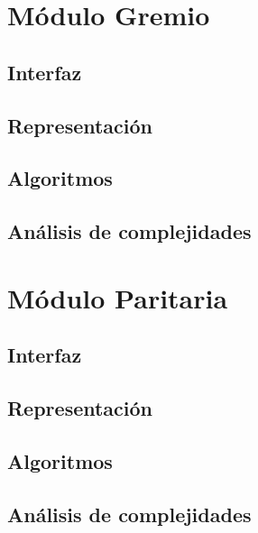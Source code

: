 \documentclass[12pt, a4paper]{article}
\begin{document}
\maketitle
\tableofcontents
\newpage

\section{Módulo Gremio} 
\subsection{Interfaz}

\subsection{Representaci\'on}

\subsection{Algoritmos}

\subsection{Análisis de complejidades}

\newpage

\section{Módulo Paritaria} 
\subsection{Interfaz}

\subsection{Representaci\'on}

\subsection{Algoritmos}

\subsection{Análisis de complejidades}

\newpage
\end{document}
